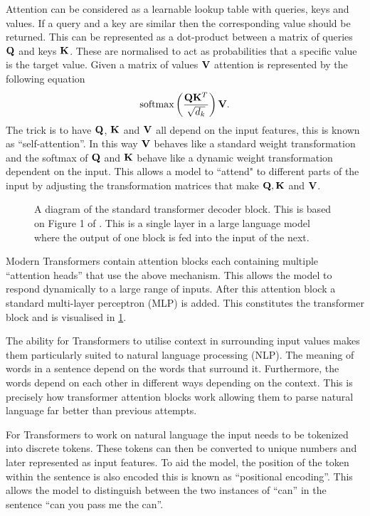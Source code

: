 Attention can be considered as a learnable lookup table with queries, keys and values.
If a query and a key are similar then the corresponding value should be returned.
This can be represented as a dot-product between a matrix of queries $\mathbf{Q}$ and keys $\mathbf{K}$.
These are normalised to act as probabilities that a specific value is the target value.
Given a matrix of values $\mathbf{V}$ attention is represented by the following equation
\begin{equation*}
    \text{softmax}\left(\frac{\mathbf{Q}\mathbf{K}^T}{\sqrt{d_k}}\right)\mathbf{V}.
\end{equation*}
The trick is to have $\mathbf{Q}$, $\mathbf{K}$ and $\mathbf{V}$ all depend on the input features, this is known as ``self-attention''.
In this way $\mathbf{V}$ behaves like a standard weight transformation and the softmax of $\mathbf{Q}$ and $\mathbf{K}$ behave like a dynamic weight transformation dependent on the input.
This allows a model to ``attend" to different parts of the input by adjusting the transformation matrices that make $\mathbf{Q}, \mathbf{K}$ and $\mathbf{V}$.

\begin{figure}
    \centering
    \captionsetup{width=.9\textwidth}
    
    \caption{A diagram of the standard transformer decoder block. This is based on Figure 1 of \citet{transformers}. This is a single layer in a large language model where the output of one block is fed into the input of the next.}
    \label{fig:transformer}
\end{figure}

Modern Transformers contain attention blocks each containing multiple ``attention heads'' that use the above mechanism.
This allows the model to respond dynamically to a large range of inputs.
After this attention block a standard multi-layer perceptron (MLP) is added.
This constitutes the transformer block and is visualised in \cref{fig:transformer}.

The ability for Transformers to utilise context in surrounding input values makes them particularly suited to natural language processing (NLP).
The meaning of words in a sentence depend on the words that surround it.
Furthermore, the words depend on each other in different ways depending on the context.
This is precisely how transformer attention blocks work allowing them to parse natural language far better than previous attempts.

For Transformers to work on natural language the input needs to be tokenized into discrete tokens.
These tokens can then be converted to unique numbers and later represented as input features.
To aid the model, the position of the token within the sentence is also encoded this is known as ``positional encoding''.
This allows the model to distinguish between the two instances of ``can'' in the sentence ``can you pass me the can''.

